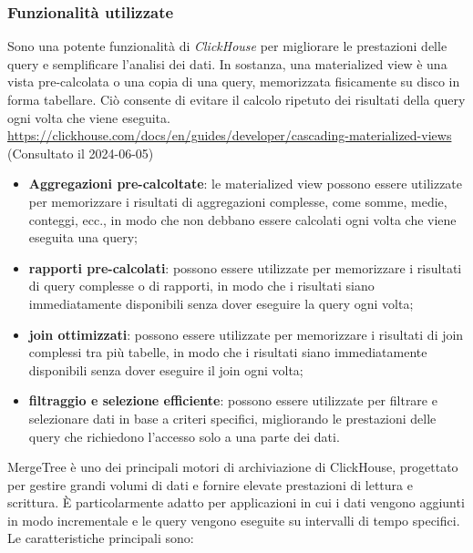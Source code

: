\subsubsection{Funzionalità utilizzate}
Sono una potente funzionalità di \textit{ClickHouse} per migliorare le prestazioni delle query e semplificare l'analisi dei dati. In sostanza, una materialized view è una vista pre-calcolata o una copia di una query, memorizzata fisicamente su disco in forma tabellare. Ciò consente di evitare il calcolo ripetuto dei risultati della query ogni volta che viene eseguita.
\url{https://clickhouse.com/docs/en/guides/developer/cascading-materialized-views} (Consultato il 2024-06-05)
\begin{itemize}
    \item \textbf{Aggregazioni pre-calcoltate}: le materialized view possono essere utilizzate per memorizzare i risultati di aggregazioni complesse, come somme, medie, conteggi, ecc., in modo che non debbano essere calcolati ogni volta che viene eseguita una query;
    \item \textbf{rapporti pre-calcolati}: possono essere utilizzate per memorizzare i risultati di query complesse o di rapporti, in modo che i risultati siano immediatamente disponibili senza dover eseguire la query ogni volta;
    \item \textbf{join ottimizzati}: possono essere utilizzate per memorizzare i risultati di join complessi tra più tabelle, in modo che i risultati siano immediatamente disponibili senza dover eseguire il join ogni volta;
    \item \textbf{filtraggio e selezione efficiente}: possono essere utilizzate per filtrare e selezionare dati in base a criteri specifici, migliorando le prestazioni delle query che richiedono l'accesso solo a una parte dei dati.
\end{itemize}
MergeTree è uno dei principali motori di archiviazione di ClickHouse, progettato per gestire grandi volumi di dati e fornire elevate prestazioni di lettura e scrittura. È particolarmente adatto per applicazioni in cui i dati vengono aggiunti in modo incrementale e le query vengono eseguite su intervalli di tempo specifici.
Le caratteristiche principali sono:
